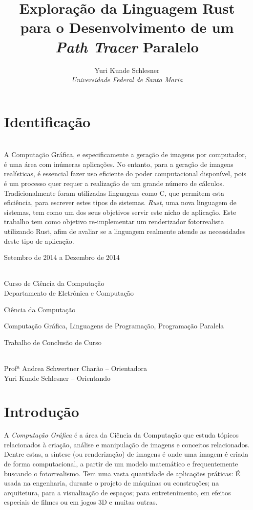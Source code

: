 \documentclass[12pt]{article}
\title{Exploração da Linguagem Rust para o Desenvolvimento de um \emph{Path Tracer} Paralelo}
\author{Yuri Kunde Schlesner \\ \emph{Universidade Federal de Santa Maria}}
\def\Cpp{{C\nolinebreak[4]\raisebox{.20ex}{\small\bf++}}}
\begin{document}
\maketitle

\section{Identificação}

\begin{description} \itemsep 0pt
	\item[Resumo:] ~\\
		A Computação Gráfica, e especificamente a geração de imagens por computador, é uma área com
		inúmeras aplicações. No entanto, para a geração de imagens realísticas, é essencial fazer
		uso eficiente do poder computacional disponível, pois é um processo quer requer a realização
		de um grande número de cálculos. Tradicionalmente foram utilizadas linguagens como \Cpp, que
		permitem esta eficiência, para escrever estes tipos de sistemas. \emph{Rust}, uma nova
		linguagem de sistemas, tem como um dos seus objetivos servir este nicho de aplicação. Este
		trabalho tem como objetivo re-implementar um renderizador fotorrealista utilizando Rust,
		afim de avaliar se a linguagem realmente atende as necessidades deste tipo de aplicação.
	\item[Período de execução:] Setembro de 2014 a Dezembro de 2014
	\item[Unidades participantes:] ~\\ Curso de Ciência da Computação \\ Departamento de Eletrônica e Computação
	\item[Área de conhecimento:] Ciência da Computação
	\item[Linha de Pesquisa:] Computação Gráfica, Linguagens de Programação, Programação Paralela
	\item[Tipo de projeto:] Trabalho de Conclusão de Curso
	\item[Participantes:] ~\\ Profª Andrea Schwertner Charão -- Orientadora \\ Yuri Kunde Schlesner -- Orientando
\end{description}

\section{Introdução}

A \emph{Computação Gráfica} é a área da Ciência da Computação que estuda tópicos relacionados à
criação, análise e manipulação de imagens e conceitos relacionados. Dentre estas, a síntese (ou
renderização) de imagens é onde uma imagem é criada de forma computacional, a partir de um modelo
matemático e frequentemente buscando o fotorrealismo. Tem uma vasta quantidade de aplicações
práticas: É usada na engenharia, durante o projeto de máquinas ou construções; na arquitetura, para
a visualização de espaços; para entretenimento, em efeitos especiais de filmes ou em jogos 3D e
muitas outras.
\end{document}

